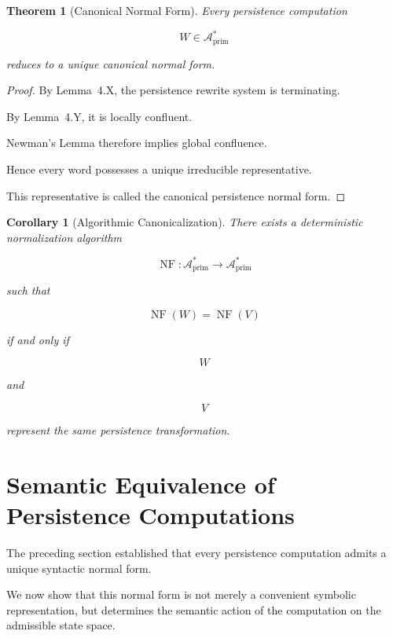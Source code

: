 \documentclass[11pt]{book}
\numberwithin{equation}{chapter}
\theoremstyle{definition}
\theoremstyle{plain}
\newtheorem{theorem}[definition]{Theorem}
\newtheorem{corollary}[definition]{Corollary}
\begin{document}
\begin{theorem}[Canonical Normal Form]

Every persistence computation

\[
W
\in
\mathcal A_{\mathrm{prim}}^*
\]

reduces to a unique canonical normal form.

\end{theorem}

\begin{proof}

By Lemma~4.X, the persistence rewrite system is terminating.

By Lemma~4.Y, it is locally confluent.

Newman's Lemma therefore implies global confluence.

Hence every word possesses a unique irreducible representative.

This representative is called the canonical persistence normal form.

\end{proof}

\begin{corollary}[Algorithmic Canonicalization]

There exists a deterministic normalization algorithm

\[
\operatorname{NF}
:
\mathcal A_{\mathrm{prim}}^*
\rightarrow
\mathcal A_{\mathrm{prim}}^*
\]

such that

\[
\operatorname{NF}(W)
=
\operatorname{NF}(V)
\]

if and only if

\[
W
\]

and

\[
V
\]

represent the same persistence transformation.

\end{corollary}

\section{Semantic Equivalence of Persistence Computations}

The preceding section established that every persistence computation admits
a unique syntactic normal form.

We now show that this normal form is not merely a convenient symbolic
representation, but determines the semantic action of the computation on
the admissible state space.
\end{document}
